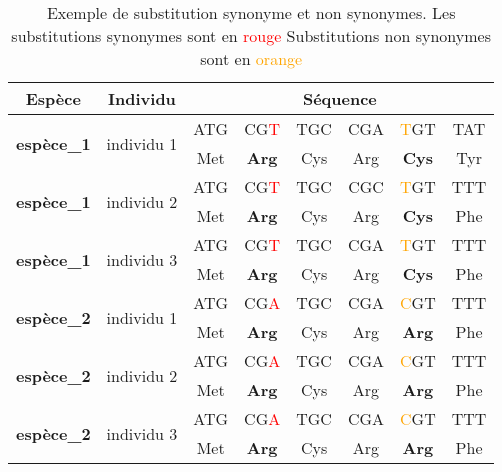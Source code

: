 \documentclass[../main]{subfiles} %
\begin{document}


\begin{table}[]
    \centering
    \footnotesize
    \begin{tabular}{cccccccc}
        \toprule
        \textbf{Espèce}                     & \textbf{Individu}             & \multicolumn{6}{c}{\textbf{Séquence}} \\
        \midrule
        \multirow{2}{*}{\textbf{espèce\_1}} & \multirow{2}{*}{individu 1}   & ATG  & CG\textcolor{red}{T}  & TGC  & CGA  & \textcolor{orange}{T}GT & TAT \\
                                            &                               & Met  & \textbf{Arg}  & Cys  & Arg  & \textbf{Cys}  & Tyr \\
        \midrule
        \multirow{2}{*}{\textbf{espèce\_1}} & \multirow{2}{*}{individu 2}   & ATG  & CG\textcolor{red}{T}  & TGC  & CGC  & \textcolor{orange}{T}GT & TTT \\
                                            &                               & Met  & \textbf{Arg}  & Cys  & Arg  & \textbf{Cys}  & Phe \\
        \midrule
        \multirow{2}{*}{\textbf{espèce\_1
        }} & \multirow{2}{*}{individu 3}   & ATG  & CG\textcolor{red}{T}  & TGC  & CGA  & \textcolor{orange}{T}GT & TTT \\
                                            &                               & Met  & \textbf{Arg}  & Cys  & Arg  & \textbf{Cys}  & Phe \\
        \midrule
        \multirow{2}{*}{\textbf{espèce\_2}} & \multirow{2}{*}{individu 1} & ATG  & CG\textcolor{red}{A}  & TGC  & CGA  & \textcolor{orange}{C}GT & TTT \\
                                            &                               & Met  & \textbf{Arg}  & Cys  & Arg  & \textbf{Arg}  & Phe   \\
        \midrule
        \multirow{2}{*}{\textbf{espèce\_2}} & \multirow{2}{*}{individu 2}   & ATG  & CG\textcolor{red}{A} & TGC  & CGA  & \textcolor{orange}{C}GT & TTT \\
                                            &                               & Met  & \textbf{Arg}  & Cys  & Arg  & \textbf{Arg}  & Phe   \\
        \midrule
        \multirow{2}{*}{\textbf{espèce\_2}} & \multirow{2}{*}{individu 3}   & ATG  & CG\textcolor{red}{A}  & TGC  & CGA  & \textcolor{orange}{C}GT & TTT \\
                                            &                               & Met  & \textbf{Arg}  & Cys  & Arg  & \textbf{Arg}  & Phe   \\
        \bottomrule
    \end{tabular}
    \scriptsize \caption{\small Exemple de substitution synonyme et non synonymes. Les substitutions synonymes sont en \textcolor{red}{rouge} Substitutions non synonymes sont en \textcolor{orange}{orange}}
    
    \label{tab:seqEx}
\end{table}
\end{document}
